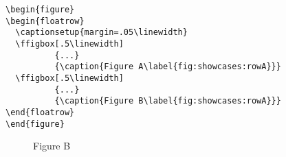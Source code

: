 \begin{verbatim}
\begin{figure}
\begin{floatrow}
  \captionsetup{margin=.05\linewidth}
  \ffigbox[.5\linewidth]
          {...}
          {\caption{Figure A\label{fig:showcases:rowA}}}
  \ffigbox[.5\linewidth]
          {...}
          {\caption{Figure B\label{fig:showcases:rowA}}}
\end{floatrow}
\end{figure}
\end{verbatim}

\begin{figure}
\begin{floatrow}
  \captionsetup{margin=.05\linewidth}
          {\caption{Figure A\label{fig:showcases:rowA}}}
          {\caption{Figure B\label{fig:showcases:rowA}}}
\end{floatrow}
\end{figure}

